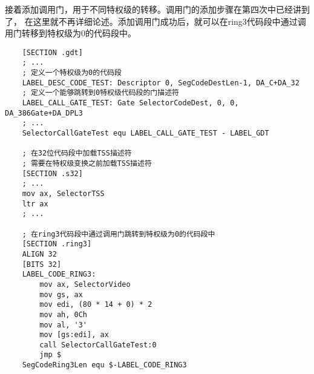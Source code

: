 \documentclass[a4paper,left=2.5cm,right=2.5cm,11pt]{article}
\begin{document}
	接着添加调用门，用于不同特权级的转移。调用门的添加步骤在第四次中已经讲到了，
	在这里就不再详细论述。添加调用门成功后，就可以在ring3代码段中通过调用门转移到特权级为0的代码段中。
	\begin{lstlisting}
	[SECTION .gdt]
	; ...
	; 定义一个特权级为0的代码段
	LABEL_DESC_CODE_TEST: Descriptor 0, SegCodeDestLen-1, DA_C+DA_32
	; 定义一个能够跳转到0特权级代码段的门描述符
	LABEL_CALL_GATE_TEST: Gate SelectorCodeDest, 0, 0, DA_386Gate+DA_DPL3
	; ...
	SelectorCallGateTest equ LABEL_CALL_GATE_TEST - LABEL_GDT

	; 在32位代码段中加载TSS描述符
	; 需要在特权级变换之前加载TSS描述符
	[SECTION .s32]
	; ...
	mov ax, SelectorTSS
	ltr ax
	; ...

	; 在ring3代码段中通过调用门跳转到特权级为0的代码段中
	[SECTION .ring3]
	ALIGN 32
	[BITS 32]
	LABEL_CODE_RING3:
		mov ax, SelectorVideo
		mov gs, ax
		mov edi, (80 * 14 + 0) * 2
		mov ah, 0Ch
		mov al, '3'
		mov [gs:edi], ax
		call SelectorCallGateTest:0
		jmp $
	SegCodeRing3Len equ $-LABEL_CODE_RING3
	\end{lstlisting}
\end{document}
